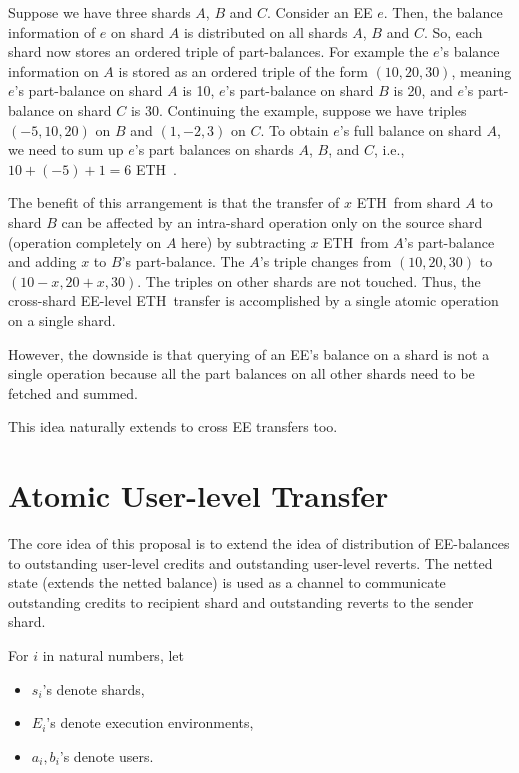 \documentclass{article}
\newcommand{\eth}[0]{ETH~}
\begin{document}
Suppose we have three shards $A$, $B$ and $C$. Consider an EE $e$. Then, the balance information of $e$ on shard $A$ is distributed on all shards $A$, $B$ and $C$. So, each shard now stores an ordered triple of part-balances. For example the $e$'s balance information on $A$ is stored as an ordered triple of the form $(10, 20, 30)$, meaning $e$'s part-balance on shard $A$ is 10, $e$'s part-balance on shard $B$ is 20, and $e$'s part-balance on shard $C$ is 30. Continuing the example, suppose we have triples $(-5, 10, 20)$ on $B$ and $(1,-2,3)$ on $C$. To obtain $e$'s full balance on shard $A$, we need to sum up $e$'s part balances on shards $A$, $B$, and $C$, i.e., $10 + (-5) + 1 = 6$ \eth. 

The benefit of this arrangement is that the transfer of $x$ \eth from shard $A$ to shard $B$ can be affected by an intra-shard operation only on the source shard (operation completely on $A$ here) by subtracting $x$ \eth from $A$'s part-balance and adding $x$ to $B$'s part-balance. The $A$'s triple changes from $(10, 20, 30)$ to $(10-x, 20+x, 30)$. The triples on other shards are not touched. Thus, the cross-shard EE-level \eth transfer is accomplished by a single atomic operation on a single shard.

However, the downside is that querying of an EE's balance on a shard is not a single operation because all the part balances on all other shards need to be fetched and summed. 

This idea naturally extends to cross EE transfers too.

\section{Atomic User-level Transfer}
\label{sec:atomic-user}
The core idea of this proposal is to extend the idea of distribution of EE-balances to outstanding user-level credits and outstanding user-level reverts. The netted state (extends the netted balance) is used as a channel to communicate outstanding credits to recipient shard and outstanding reverts to the sender shard.

For $i$ in natural numbers, let
\begin{itemize}
\item $s_i$'s denote shards, 
\item $E_i$'s denote execution environments,
\item $a_i, b_i$'s denote users.
\end{itemize}
\end{document}
